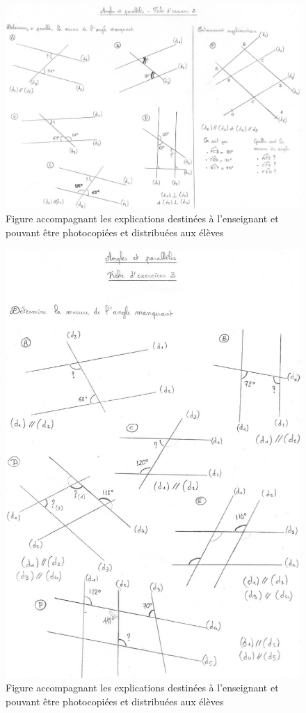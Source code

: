 \begin{figure}[h!]
    \centering
    \includegraphics[width=0.8\linewidth]{img/anglesfiche2.jpg}
    \caption{Figure accompagnant les explications destinées à l'enseignant et pouvant être photocopiées et distribuées aux élèves}
    \label{fig:angles-fiche2}
\end{figure}

\begin{figure}[h!]
    \centering
    \includegraphics[width=0.6\linewidth]{img/anglesfiche3.jpg}
    \caption{Figure accompagnant les explications destinées à l'enseignant et pouvant être photocopiées et distribuées aux élèves}
    \label{fig:angles-fiche3}
\end{figure}

\clearpage

